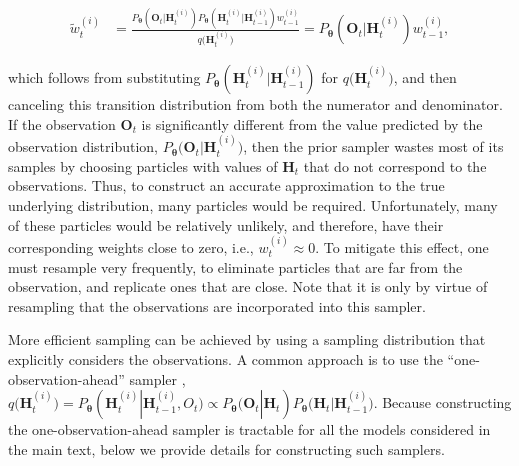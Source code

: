 \documentclass[10pt]{article}
\providecommand{\ve}[1]{\boldsymbol{#1}}
\providecommand{\ve}[1]{\boldsymbol{#1}}
\newcommand{\thetn}{\ve{\theta}}
\newcommand{\p}{P_{\thetn}}
\newcommand{\q}{q\big(\ve{H}_t^{(i)}\big)}
\begin{document}
\begin{align} \label{eq:prior_weights}
\widetilde{w}_t^{(i)} &= \frac{\p(\ve{O}_t | \ve{H}_t^{(i)})  \p(\ve{H}_t^{(i)} | \ve{H}_{t-1}^{(i)}) w_{t-1}^{(i)}}{\q} %
=\p(\ve{O}_t | \ve{H}_t^{(i)}) w_{t-1}^{(i)},
\end{align}

\noindent which follows from substituting $\p(\ve{H}_t^{(i)} | \ve{H}_{t-1}^{(i)})$ for $\q$, and then canceling this transition distribution from both the numerator and denominator. If the observation $\ve{O}_t$ is significantly different from the value predicted by the observation distribution, $\p\big(\ve{O}_t | \ve{H}_t^{(i)}\big)$, then the prior sampler wastes most of its samples by choosing particles with values of $\ve{H}_t$ that do not correspond to the observations.  Thus, to construct an accurate approximation to the true underlying distribution, many particles would be required. Unfortunately, many of these particles would be relatively unlikely, and therefore, have their corresponding weights close to zero, i.e., $w_t^{(i)} \approx 0$.  To mitigate this effect, one must resample very frequently, to eliminate particles that are far from the observation, and replicate ones that are close. Note that it is only by virtue of resampling that the observations are incorporated into this sampler.

More efficient sampling can be achieved by using a sampling distribution that explicitly considers the observations.  A common approach is to use the ``one-observation-ahead'' sampler \cite{DoucetGordon01}, $\q = \p(\ve{H}_t^{(i)} | \ve{H}_{t-1}^{(i)}, O_t) \propto \p(\ve{O}_t | \ve{H}_t) \p\big(\ve{H}_t | \ve{H}_{t-1}^{(i)}\big)$. Because constructing the one-observation-ahead sampler is tractable for all the models considered in the main text, below we provide details for constructing such samplers.

\end{document}
